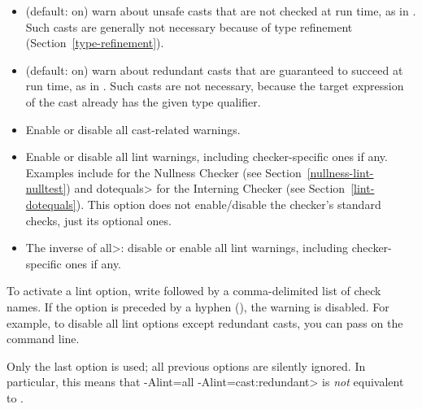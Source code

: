\begin{itemize}

\item
   (default: on) warn about unsafe casts that are not
  checked at run time, as in .  Such casts
  are generally not necessary because of type refinement
  (Section~\ref{type-refinement}).

\item
   (default: on) warn about redundant
  casts that are guaranteed to succeed at run time,
  as in .  Such casts are not necessary,
  because the target expression of the cast already has the given type
  qualifier.

\item
   Enable or disable all cast-related warnings.

\item
\begin{sloppypar}
   Enable or disable all lint warnings, including
  checker-specific ones if any.  Examples include  for the
  Nullness Checker (see Section~\ref{nullness-lint-nulltest}) and \<dotequals> for
  the Interning Checker (see Section~\ref{lint-dotequals}).  This option
  does not enable/disable the checker's standard checks, just its optional
  ones.
\end{sloppypar}

\item
   The inverse of \<all>:  disable or enable all lint warnings,
  including checker-specific ones if any.

\end{itemize}


\noindent
To activate a lint option, write  followed by a
comma-delimited list of check names.  If the option is preceded by a
hyphen (\code{-}), the warning is disabled.  For example, to disable all
lint options except redundant casts, you can pass
 on the command line.

Only the last  option is used; all previous 
options are silently ignored.  In particular, this means that \<-Alint=all
-Alint=cast:redundant> is \emph{not} equivalent to
.


